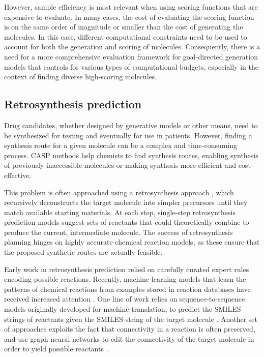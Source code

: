 However, sample efficiency is most relevant when using scoring functions that are expensive to
evaluate. In many cases, the cost of evaluating the scoring function is on the same order of
magnitude or smaller than the cost of generating the molecules. In this case, different computational
constraints need to be used to account for both the generation and scoring of molecules. Consequently, there is a
need for a more comprehensive evaluation framework for goal-directed generation models that controls
for various types of computational budgets, especially in the context of finding diverse high-scoring
molecules.

\subsection{Retrosynthesis prediction}
Drug candidates, whether designed by generative models or other means, need to be
synthesized for testing and eventually for use in patients. However, finding a synthesis route for a
given molecule can be a complex and time-consuming process. \Ac{CASP} methods help
chemists to find synthesis routes, enabling synthesis of previously inaccessible molecules or making
synthesis more efficient and cost-effective.

This problem is often approached using a retrosynthesis approach
\citep{coreyComputerAssistedDesignComplex1969,coreyLogicChemicalSynthesis1991a}, which
recursively deconstructs the target molecule into simpler precursors until they match available
starting materials. At each step, single-step retrosynthesis prediction models suggest sets of
reactants that could theoretically combine to produce the current, intermediate molecule.
The success of retrosynthesis planning hinges on highly accurate chemical reaction models, as these
ensure that the proposed synthetic routes are actually feasible.

Early work in retrosynthesis prediction relied on carefully curated expert rules encoding possible
reactions. Recently, machine learning models that learn the patterns of chemical reactions from
examples stored in reaction databases have received increased attention
\citep{coleyMachineLearningComputerAided2018}. One line of work relies on sequence-to-sequence
models originally developed for machine translation, to predict the SMILES strings of reactants
given the SMILES string of the target molecule
\citep{schwallerMolecularTransformerModel2019,namLinkingNeuralMachine2016,schwallerFoundTranslationPredicting2018,karpovTransformerModelRetrosynthesis2019,tetkoStateoftheartAugmentedNLP2020}.
Another set of approaches exploits the fact that connectivity in a reaction is often preserved, and
use graph neural networks to edit the connectivity of the target molecule in order to yield possible
reactants
\citep{sachaMoleculeEditGraph2020,shiGraphGraphsFramework2020,somnathLearningGraphModels2020,yanRetroXpertDecomposeRetrosynthesis2020}.

